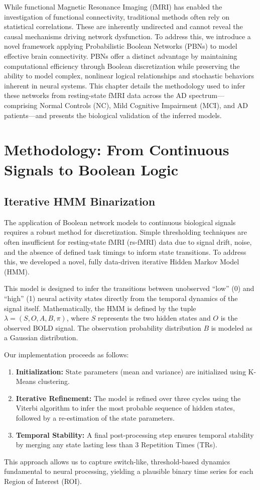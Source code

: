 \documentclass[12pt, a4paper]{report}
\begin{document}
While functional Magnetic Resonance Imaging (fMRI) has enabled the investigation of functional connectivity, traditional methods often rely on statistical correlations. These are inherently undirected and cannot reveal the causal mechanisms driving network dysfunction. To address this, we introduce a novel framework applying Probabilistic Boolean Networks (PBNs) to model effective brain connectivity. PBNs offer a distinct advantage by maintaining computational efficiency through Boolean discretization while preserving the ability to model complex, nonlinear logical relationships and stochastic behaviors inherent in neural systems. This chapter details the methodology used to infer these networks from resting-state fMRI data across the AD spectrum—comprising Normal Controls (NC), Mild Cognitive Impairment (MCI), and AD patients—and presents the biological validation of the inferred models.

\section{Methodology: From Continuous Signals to Boolean Logic}

\subsection{Iterative HMM Binarization}
The application of Boolean network models to continuous biological signals requires a robust method for discretization. Simple thresholding techniques are often insufficient for resting-state fMRI (rs-fMRI) data due to signal drift, noise, and the absence of defined task timings to inform state transitions. To address this, we developed a novel, fully data-driven iterative Hidden Markov Model (HMM).

This model is designed to infer the transitions between unobserved ``low'' (0) and ``high'' (1) neural activity states directly from the temporal dynamics of the signal itself. Mathematically, the HMM is defined by the tuple $\lambda = (S, O, A, B, \pi)$, where $S$ represents the two hidden states and $O$ is the observed BOLD signal. The observation probability distribution $B$ is modeled as a Gaussian distribution.

Our implementation proceeds as follows:
\begin{enumerate}
	\item \textbf{Initialization:} State parameters (mean and variance) are initialized using K-Means clustering.
	\item \textbf{Iterative Refinement:} The model is refined over three cycles using the Viterbi algorithm to infer the most probable sequence of hidden states, followed by a re-estimation of the state parameters.
	\item \textbf{Temporal Stability:} A final post-processing step ensures temporal stability by merging any state lasting less than 3 Repetition Times (TRs).
\end{enumerate}
This approach allows us to capture switch-like, threshold-based dynamics fundamental to neural processing, yielding a plausible binary time series for each Region of Interest (ROI).
\end{document}
